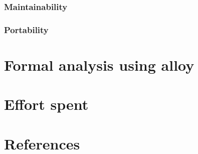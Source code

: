 \documentclass{Configuration_Files/PoliMi3i_thesis}
\begin{document}
\subsection{Maintainability}

\subsection{Portability}

\chapter{Formal analysis using alloy}

\chapter{Effort spent}

\chapter{References}
\end{document}
